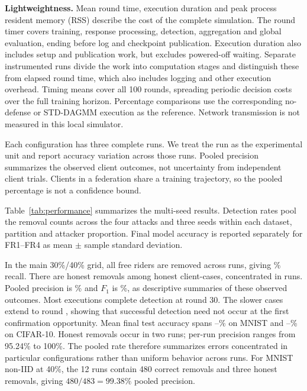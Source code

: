 \documentclass[journal]{IEEEtran}
\makeatletter
\renewcommand{\subsection}{\@startsection{subsection}{2}{\z@}{1.5ex}{0.7ex}{\normalfont\normalsize\itshape}}
\makeatother
\begin{document}
\textbf{Lightweightness.} Mean round time, execution duration and peak
process resident memory (RSS) describe the cost of the complete simulation.
The round timer covers training, response processing, detection,
aggregation and global evaluation, ending before log and checkpoint
publication. Execution duration also includes setup and publication work,
but excludes powered-off waiting. Separate instrumented runs divide the
work into computation stages and distinguish these from elapsed round
time, which also includes logging and other execution overhead. Timing means
cover all 100 rounds, spreading periodic decision costs over the full
training horizon. Percentage comparisons use the corresponding
no-defense or STD-DAGMM execution as the reference. Network transmission
is not measured in this local simulator.

Each configuration has three complete runs. We treat the run as the
experimental unit and report accuracy variation across those runs.
Pooled precision summarizes the observed client outcomes, not uncertainty
from independent client trials. Clients in a federation share a training
trajectory, so the pooled percentage is not a confidence bound.


\subsection{Permanent Detection and Model Utility}
Table~\ref{tab:performance} summarizes the multi-seed results. Detection
rates pool the removal counts across the four attacks and three seeds
within each dataset, partition and attacker proportion. Final model accuracy is reported
separately for FR1--FR4 as mean $\pm$ sample standard deviation.

In the main 30\%/40\% grid, all free riders are removed across \ReviewRunCount{} runs, giving
\MultiRecall\% recall. There are \MultiFP{} honest removals among
\ReviewHonestCases{} honest client-cases, concentrated in
\ReviewAffectedRuns{} runs. Pooled precision is \MultiPrecision\% and
$F_1$ is \MultiFone\%, as descriptive summaries of these observed outcomes.
Most executions complete detection at round 30. The slower cases extend
to round \MultiCompletionMax{}, showing that successful detection need
not occur at the first confirmation opportunity. Mean final test
accuracy spans \MultiMnistAccuracyMin--\MultiMnistAccuracyMax\% on MNIST
and \MultiCifarAccuracyMin--\MultiCifarAccuracyMax\% on CIFAR-10.
Honest removals occur in two runs; per-run precision ranges from 95.24\%
to 100\%. The pooled rate therefore summarizes errors concentrated in
particular configurations rather than uniform behavior across runs.
For MNIST non-IID at 40\%, the 12 runs contain 480 correct removals
and three honest removals, giving $480/483=99.38\%$ pooled precision.
\end{document}
